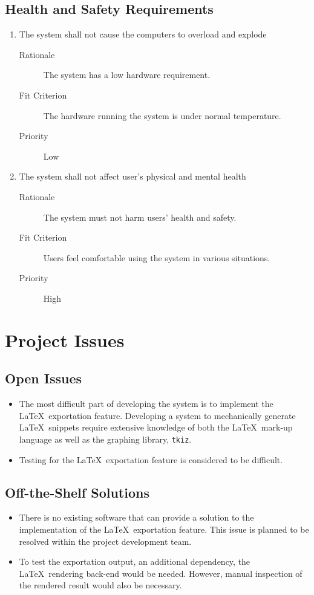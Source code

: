 \documentclass[12pt, titlepage]{article}
\begin{document}
\subsection{Health and Safety Requirements}
\begin{enumerate}[resume*=NFR]
\item The system shall not cause the computers to overload and explode
  \begin{description}
  \item[Rationale] The system has a low hardware requirement.
  \item[Fit Criterion] The hardware running the system is under normal temperature.
  \item[Priority] Low
  \end{description}

\item The system shall not affect user's physical and mental health
  \begin{description}
  \item[Rationale] The system must not harm users' health and safety.
  \item[Fit Criterion] Users feel comfortable using the system in various
    situations.
  \item[Priority] High
  \end{description}

\end{enumerate}

\section{Project Issues}

\subsection{Open Issues}

\begin{itemize}
\item The most difficult part of developing the system is to implement the \LaTeX\
  exportation feature. Developing a system to mechanically generate \LaTeX\
  snippets require extensive knowledge of both the \LaTeX\ mark-up language as
  well as the graphing library, \verb|tkiz|.
\item Testing for the \LaTeX\ exportation feature is considered to be difficult.
\end{itemize}

\subsection{Off-the-Shelf Solutions}
\begin{itemize}
\item There is no existing software that can provide a solution to the
  implementation of the \LaTeX\ exportation feature. This issue is planned to be
  resolved within the project development team.
\item To test the exportation output, an additional dependency, the \LaTeX\ rendering
  back-end would be needed. However, manual inspection of the rendered result
  would also be necessary.
\end{itemize}
\end{document}
